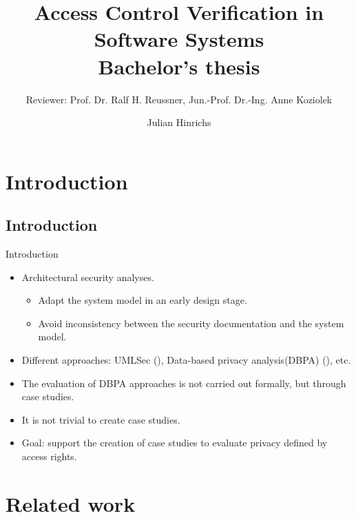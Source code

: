 \documentclass[18pt]{beamer}
\title[Access Control Verification in Software Systems]{Access Control Verification in Software
Systems\\Bachelor's thesis}
\subtitle{Reviewer: Prof. Dr. Ralf H. Reussner, Jun.-Prof. Dr.-Ing. Anne Koziolek}
\author{Julian Hinrichs}
\institute{Chair for Software Design and Quality}
\begin{document}

\begin{frame}
\titlepage
\end{frame}
%

\section{Introduction}
\subsection{Introduction}
\begin{frame}{Introduction}
\begin{itemize}
\item Architectural security analyses.
\pause
\begin{itemize}
\item Adapt the system model in an early design stage.
\item Avoid inconsistency between the security documentation and the system model.
\end{itemize}
\pause
\item Different approaches: UMLSec (\cite{UMLSec}), Data-based privacy analysis(DBPA) (\cite{Seifermann16}), etc.
\pause
\item The evaluation of DBPA approaches is not carried out formally, but through case studies.
\pause
\item It is not trivial to create case studies.
\item Goal: support the creation of case studies to evaluate privacy defined by access rights.
\end{itemize}
\end{frame}


\section{Related work}
\end{document}
